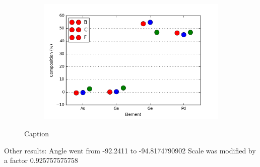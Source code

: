 \begin{figure}
\begin{subfigure}{0.45\textwidth}
	\caption{}
	\label{fig:BCF-plots-F}
\end{subfigure}
\hfill
\begin{subfigure}{0.45\textwidth}
	\includegraphics[width=\textwidth]{fig/q/B-C-F/all}
	\caption{}
	\label{fig:BCF-plots-all}
\end{subfigure}
	\caption{
		\label{fig:BCF-plots}%
		Caption}
\end{figure}


Other results:
Angle went from -92.2411 to -94.8174790902
Scale was modified by a factor 0.925757575758
